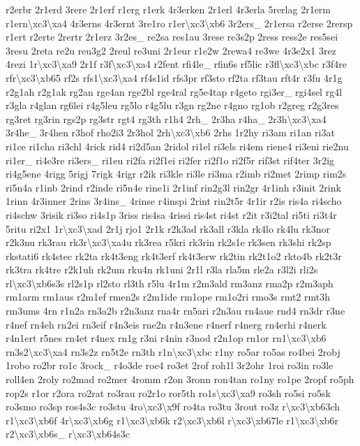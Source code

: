 \begin{DoxyCompactItemize}
r2erbr 2r1erd 3rere 2r1erf r1erg r1erk 4r3erken 2r1erl 4r3erla 5rerlag 2r1erm r1ern\textbackslash{}xc3\textbackslash{}xa4 4r3erns 4r3ernt 3re1ro r1er\textbackslash{}xc3\textbackslash{}xb6 3r2ers\-\_\- 2r1ersa r2erse 2rersp r1ert r2erte 2rertr 2r1erz 3r2es\-\_\- re2sa res1au 3rese re3s2p 2ress ress2e res5sei 3resu 2reta re2u reu3g2 2reul re3uni 2r1eur r1e2w 2rewa4 re3we 4r3e2x1 3rez 4rezi 1r\textbackslash{}xc3\textbackslash{}xa9 2r1f r3f\textbackslash{}xc3\textbackslash{}xa4 r2fent rfi4le\-\_\- rfin6s rf5lic r3fl\textbackslash{}xc3\textbackslash{}xbc r3f4re rfr\textbackslash{}xc3\textbackslash{}xb65 rf2s rfs1\textbackslash{}xc3\textbackslash{}xa4 rf4s1id rfs3pr rf3sto rf2ta rf3tau rft4r r3fu 4r1g r2g1ah r2g1ak rg2an rge4an rge2bl rge4ral rg5e4tap r4geto rgi3er\-\_\- rgi4sel rg4l r3gla r4glan rg6lei r4g5leu rg5lo r4g5lu r3gn rg2ne r4gno rg1ob r2greg r2g3res rg3ret rg3rin rgs2p rg3str rgt4 rg3th r1h4 2rh\-\_\- 2r3ha r4ha\-\_\- 2r3h\textbackslash{}xc3\textbackslash{}xa4 3r4he\-\_\- 3r4hen r3hof rho2i3 2r3hol 2rh\textbackslash{}xc3\textbackslash{}xb6 2rhs 1r2hy ri3am ri1an ri3at ri1ce ri1cha ri3chl 4rick rid4 ri2d5an 2ridol ri1el ri3els ri4em riene4 ri3eni rie2nu ri1er\-\_\- ri4e3re ri3ers\-\_\- ri1eu ri2fa ri2f1ei ri2fer ri2f1o ri2f5r rif3st rif4ter 3r2ig ri4g5ene 4rigg 5rigj 7rigk 4rigr r2ik ri3kle ri3le ri3ma r2imb ri2met 2rimp rim2s ri5n4a r1inb 2rind r2inde ri5n4e rine1i 2r1inf rin2g3l rin2gr 4r1inh r3init 2rink 1rinn 4r3inner 2rins 3r4ins\-\_\- 4rinse r4inspi 2rint rin2t5r 4r1ir r2is ris4a ri4scho ri4schw 3risik ri3so ri4s1p 3riss ris4sa 4rissi ris4st ri4st r2it r3i2tal ri5ti ri3t4r 5ritu ri2x1 1r\textbackslash{}xc3\textbackslash{}xad 2r1j rjo1 2r1k r2k3ad rk3all r3kla rk4lo rk4lu rk3nor r2k3nu rk3rau rk3r\textbackslash{}xc3\textbackslash{}xa4u rk3rea r5kri rk3rin rk2s1e rk3sen rk3shi rk2sp rkstati6 rk4stec rk2ta rk4t3eng rk4t3erf rk4t3erw rk2tin rk2t1o2 rkto4b rk2t3r rk3tra rk4tre r2k1uh rk2um rku4n rk1uni 2r1l r3la rla5m rle2a r3l2i rli2s rl\textbackslash{}xc3\textbackslash{}xb6s3s rl2s1p rl2sto rl3th r5lu 4r1m r2m3ald rm3anz rma2p r2m3aph rm1arm rm1aus r2m1ef rmen2s r2m1ide rm1ope rm1o2ri rmo3s rmt2 rmt3h rm3ums 4rn r1n2a rn3a2b r2n3anz rna4r rn5ari r2n3au rn4aue rnd4 rn3dr r3ne r4nef rn4eh rn2ei rn3eif r4n3eis rne2n r4n3ene r4nerf r4nerg rn4erhi r4nerk r4n1ert r5nes rn4et r4nex rn1g r3ni r4nin r3nod r2n1op rn1or rn1\textbackslash{}xc3\textbackslash{}xb6 rn3s2\textbackslash{}xc3\textbackslash{}xa4 rn3s2z rn5t2e rn3th r1n\textbackslash{}xc3\textbackslash{}xbc r1ny ro5ar ro5as ro4bei 2robj 1robo ro2br ro1c 3rock\-\_\- r4o3de roe4 ro3et 2rof roh1l 3r2ohr 1roi ro3in ro3le roll4en 2roly ro2mad ro2mer 4romm r2on 3ronn ron4tan ro1ny ro1pe 2ropf ro5ph rop2s r1or r2ora ro2rat ro3rau ro2r1o ror5th ro1s\textbackslash{}xc3\textbackslash{}xa9 ro3sh ro5si ro5sk ro3smo ro3sp ros4s3c ro3stu 4ro\textbackslash{}xc3\textbackslash{}x9f ro4ta ro3tu 3rout ro3z r\textbackslash{}xc3\textbackslash{}xb63ch r1\textbackslash{}xc3\textbackslash{}xb6f 4r\textbackslash{}xc3\textbackslash{}xb6g r1\textbackslash{}xc3\textbackslash{}xb6k r2\textbackslash{}xc3\textbackslash{}xb6l r\textbackslash{}xc3\textbackslash{}xb67le r1\textbackslash{}xc3\textbackslash{}xb6r r2\textbackslash{}xc3\textbackslash{}xb6s\-\_\- r\textbackslash{}xc3\textbackslash{}xb64s3c 
\end{DoxyCompactItemize}
